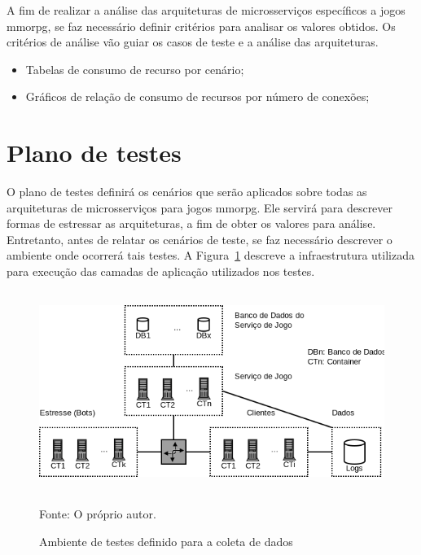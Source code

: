 A fim de realizar a análise das arquiteturas de microsserviços específicos a jogos \ac{mmorpg}, se faz necessário definir critérios para analisar os valores obtidos.
%
Os critérios de análise vão guiar os casos de teste e a análise das arquiteturas.



\begin{itemize}
  \item Tabelas de consumo de recurso por cenário;
  \item Gráficos de relação de consumo de recursos por número de conexões;
\end{itemize}






\section {Plano de testes}
\label{sec:plano}



O plano de testes definirá os cenários que serão aplicados sobre todas as arquiteturas de microsserviços para jogos \ac{mmorpg}.
%
Ele servirá para descrever formas de estressar as arquiteturas, a fim de obter os valores para análise.
%
Entretanto, antes de relatar os cenários de teste, se faz necessário descrever o ambiente onde ocorrerá tais testes.
%
A Figura~\ref{Ambiente de testes} descreve a infraestrutura utilizada para execução das camadas de aplicação utilizados nos testes.



\begin{figure}[htb!]
  \caption{Ambiente de testes definido para a coleta de dados}
  \label{Ambiente de testes}
  \includegraphics[height=6.5cm]{img/cap3/infraestrutura.png}
  \centering

  Fonte: O próprio autor.
\end{figure}



